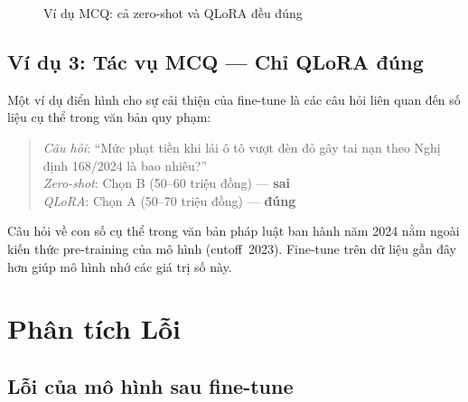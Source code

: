 \documentclass[fontsize=13pt,a4paper,oneside,DIV=calc,chapterprefix=true]{scrbook}
\begin{document}
\begin{figure}[H]
\centering
{}
\caption{Ví dụ MCQ: cả zero-shot và QLoRA đều đúng}
\label{fig:mcq_qual}
\end{figure}

\subsection{Ví dụ 3: Tác vụ MCQ --- Chỉ QLoRA đúng}

Một ví dụ điển hình cho sự cải thiện của fine-tune là các câu hỏi liên quan đến số liệu cụ
thể trong văn bản quy phạm:

\begin{quote}
\textit{Câu hỏi}: ``Mức phạt tiền khi lái ô tô vượt đèn đỏ gây tai nạn theo Nghị định
168/2024 là bao nhiêu?''\\
\textit{Zero-shot}: Chọn B (50--60 triệu đồng) --- \textbf{sai}\\
\textit{QLoRA}: Chọn A (50--70 triệu đồng) --- \textbf{đúng}
\end{quote}

Câu hỏi về con số cụ thể trong văn bản pháp luật ban hành năm 2024 nằm ngoài kiến thức
pre-training của mô hình (cutoff~2023). Fine-tune trên dữ liệu gần đây hơn giúp mô hình
nhớ các giá trị số này.

\section{Phân tích Lỗi}

\subsection{Lỗi của mô hình sau fine-tune}
\end{document}
